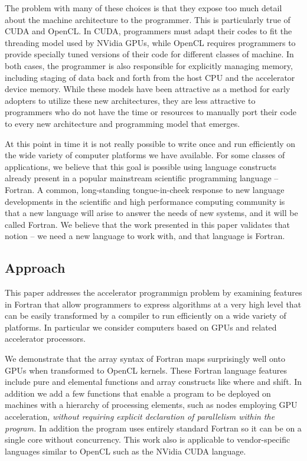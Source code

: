 The problem with many of these choices is that they expose too much
detail about the machine architecture to the programmer.  This is
particularly true of CUDA and OpenCL.  In CUDA, programmers must adapt
their codes to fit the threading model used by NVidia GPUs, while
OpenCL requires programmers to provide specially tuned versions of
their code for different classes of machine.  In both cases, the
programmer is also responsible for explicitly managing memory,
including staging of data back and forth from the host CPU and the
accelerator device memory.  While these models have been attractive as
a method for early adopters to utilize these new architectures, they
are less attractive to programmers who do not have the time or
resources to manually port their code to every new architecture and
programming model that emerges.

At this point in time it is not really possible to write once and run
efficiently on the wide variety of computer platforms we have
available.  For some classes of applications, we believe that this
goal is possible using language constructs already present in a
popular mainstream scientific programming language -- Fortran.  A
common, long-standing tongue-in-cheek response to new language
developments in the scientific and high performance computing
community is that a new language will arise to answer the needs of new
systems, and it will be called Fortran.  We believe that the work
presented in this paper validates that notion -- we need a new
language to work with, and that language is Fortran.

\subsection{Approach}

This paper addresses the accelerator programmign problem by examining
features in Fortran that allow programmers to express algorithms at a
very high level that can be easily transformed by a compiler to run
efficiently on a wide variety of platforms.  In particular we consider
computers based on GPUs and related accelerator processors.

We demonstrate that the array syntax of Fortran maps surprisingly well
onto GPUs when transformed to OpenCL kernels.  These Fortran language
features include pure and elemental functions and array constructs
like where and shift.  In addition we add a few functions that enable
a program to be deployed on machines with a hierarchy of processing
elements, such as nodes employing GPU acceleration, \emph{without
  requiring explicit declaration of parallelism within the program.}
In addition the program uses entirely standard Fortran so it can be on
a single core without concurrency.  This work also is applicable
to vendor-specific languages similar to OpenCL such as the NVidia
CUDA language.

